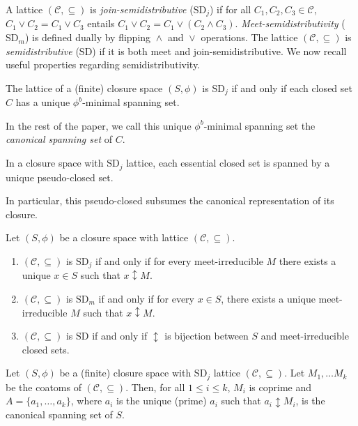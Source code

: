 \documentclass[12pt, a4paper]{article}
\newcommand{\cc}[1]{\mathcal{#1}}  %
\newcommand{\U}{S}  %
\newcommand{\SDj}{\mathrm{SD}_j}  %
\newcommand{\SDm}{\mathrm{SD}_m}  %
\newcommand{\SD}{\mathrm{SD}}  %
\DeclareMathOperator{\dpp}{\updownarrow}  %
\DeclareMathOperator{\mt}{\land}  %
\DeclareMathOperator{\jn}{\lor}  %
\newcommand{\cl}{\phi}  %
\newcommand{\cs}{\cc{C}} %
\begin{document}
A lattice $(\cs, \subseteq)$ is \emph{join-semidistributive} ($\SDj$) if for all $C_1, C_2, C_3 \in \cs$, 
$C_1 \jn C_2 = C_1 \jn C_3$ entails $C_1 \jn C_2 = C_1 \jn (C_2 \mt C_3)$.
\emph{Meet-semidistributivity} ($\SDm$) is defined dually by flipping $\mt$ and $\jn$ operations.
The lattice $(\cs, \subseteq)$ is \emph{semidistributive} ($\SD$) if it is both meet and join-semidistributive.
We now recall useful properties regarding semidistributivity.

\begin{theorem} \label{thm:SDj-canonical}
The lattice of a (finite) closure space $(\U, \cl)$ is $\SDj$ if and only if each closed set $C$ has a unique $\cl^b$-minimal spanning set.
\end{theorem}

In the rest of the paper, we call this unique $\cl^b$-minimal spanning set the \emph{canonical spanning set} of $C$.

\begin{proposition} \label{prop:SDj-UC}
In a closure space with $\SDj$ lattice, each essential closed set is spanned by a unique pseudo-closed set.
\end{proposition}

In particular, this pseudo-closed subsumes the canonical representation of its closure.

\begin{theorem} \label{thm:SD-arrows}
Let $(\U, \cl)$ be a closure space with lattice $(\cs, \subseteq)$.
\begin{enumerate}[(1)]
    \item $(\cs, \subseteq)$ is $\SDj$ if and only if for every meet-irreducible $M$ there exists a unique $x \in \U$ such that $x \dpp M$.
    \item $(\cs, \subseteq)$ is $\SDm$ if and only if for every $x \in \U$, there exists a unique meet-irreducible $M$ such that $x \dpp M$.
    \item $(\cs, \subseteq)$ is $\SD$ if and only if $\dpp$ is bijection between $\U$ and meet-irreducible closed sets.
\end{enumerate}
\end{theorem}

\begin{theorem} \label{thm:coatoms-SDj}
Let $(\U, \cl)$ be a (finite) closure space with $\SDj$ lattice $(\cs, \subseteq)$.
Let $M_1, \dots M_k$ be the coatoms of $(\cs, \subseteq)$.
Then, for all $1 \leq i \leq k$, $M_i$ is coprime and $A = \{a_1, \dots, a_k\}$, where $a_i$ is the unique (prime) $a_i$ such that $a_i \dpp M_i$, is the canonical spanning set of $\U$.
\end{theorem}
\end{document}
